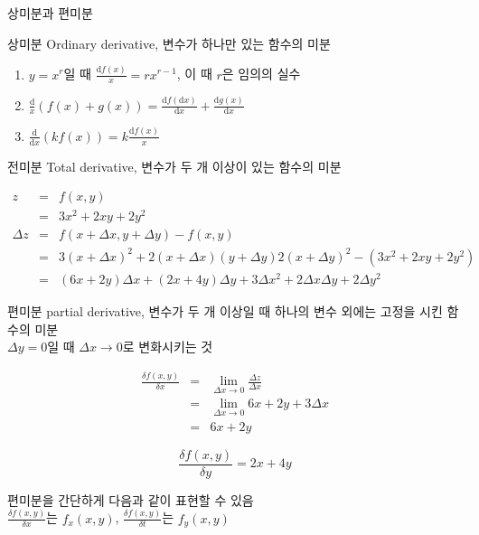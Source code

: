 \documentclass[10pt,t]{beamer}
\begin{document}
\begin{frame}{상미분과 편미분}
    \begin{block}{상미분}
        Ordinary derivative, 변수가 하나만 있는 함수의 미분 
    \end{block}
\begin{enumerate}
    \item $y = x^r$일 때 $\frac{\text{d}f(x)}{x}=rx^{r-1} $, 이 때 $r$은 임의의 실수
    \item $\frac{\text{d}}{x}\left( f(x)+g(x) \right) = \frac{\text{d}f(\text{d}x)}{\text{d}x}+ \frac{\text{d}g(x)}{\text{d}x}$
    \item $\frac{\text{d}}{\text{d}x}\left( kf(x)\right) = k\frac{\text{d}f(x)}{x}$
\end{enumerate}
\begin{block}{전미분}
    Total derivative, 변수가 두 개  이상이 있는 함수의 미분 
\end{block}
\begin{eqnarray*}
    z &=&f(x, y)\\
    &=& 3x^2 + 2xy + 2y^2\\
    \Delta z &=& f(x+\Delta x, y  + \Delta y) - f(x, y)\\
    &=& 3(x+\Delta x)^2 + 2(x+\Delta x)(y+\Delta y) 2(x+\Delta y)^2 - (3x^2 + 2xy + 2y^2)\\
    &=& (6x + 2y)\Delta x + (2x+4y)\Delta y + 3 \Delta x^2 + 2 \Delta x \Delta y + 2 \Delta y^2
\end{eqnarray*}



\begin{block}{편미분}
    partial derivative, 변수가 두 개  이상일 때 하나의 변수 외에는 고정을 시킨 함수의 미분 \\
    $\Delta y = 0$일 때 $\Delta x \rightarrow 0$로 변화시키는 것
\end{block}
\begin{eqnarray*}
    \frac{\delta f(x, y)}{\delta x} &=& \lim _{\Delta x \rightarrow 0} \frac{\Delta z}{\Delta x} \\
    &=& \lim _{\Delta x \rightarrow 0} 6x + 2y + 3\Delta x \\
    &=& 6x + 2y
\end{eqnarray*}

\begin{equation*}
    \frac{\delta f(x, y)}{\delta y} = 2x + 4y
\end{equation*}

편미분을 간단하게 다음과 같이 표현할 수 있음\\ $\frac{\delta f(x, y)}{\delta x}$는 $f_x(x, y)$, $\frac{\delta f(x, y)}{\delta t}$는 $f_y(x, y)$

\end{frame}
\end{document}
